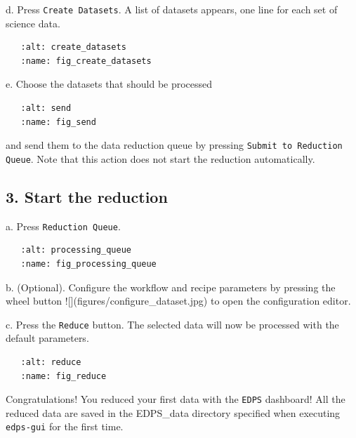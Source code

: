 \documentclass{article}
\begin{document}
d. Press \texttt{Create Datasets}. A list of datasets appears, one line for each set of science data.

\begin{verbatim}
   :alt: create_datasets
   :name: fig_create_datasets
\end{verbatim}

e. Choose the datasets that should be processed 

\begin{verbatim}
   :alt: send
   :name: fig_send
\end{verbatim}
and send them to the data reduction queue by pressing \texttt{Submit to Reduction Queue}. Note that this action does not start the 
reduction automatically.

\subsection{3. Start the reduction}

a. Press \texttt{Reduction Queue}.

\begin{verbatim}
   :alt: processing_queue
   :name: fig_processing_queue
\end{verbatim}


b. (Optional). Configure the workflow and recipe parameters by pressing the wheel 
button ![](figures/configure_dataset.jpg) to open the configuration editor.

c.  Press the \texttt{Reduce} button. The selected data will now be processed with the default parameters.

\begin{verbatim}
   :alt: reduce
   :name: fig_reduce
\end{verbatim}


Congratulations! You reduced your first data with the \texttt{EDPS} dashboard! All the reduced data are saved in the EDPS_data directory specified when executing \texttt{edps-gui} for the first time.


            
\end{document}
